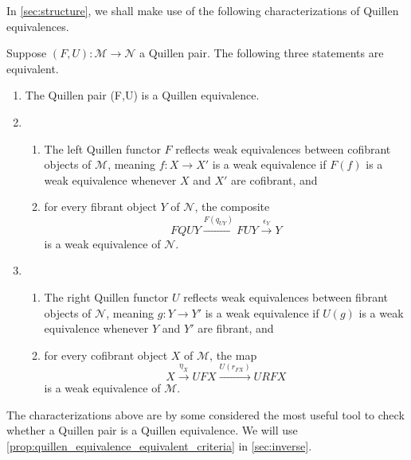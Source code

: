 In \cref{sec:structure}, we shall make use of the following characterizations \cite[Cor.~1.3.16, p.~21]{Ho99} of Quillen equivalences.
\begin{proposition}\label{prop:quillen_equivalence_equivalent_criteria}
Suppose $(F,U):\mathscr{M} \to \mathscr{N}$ a Quillen pair. The following three statements are equivalent.
\begin{enumerate}
\item{The Quillen pair (F,U) is a Quillen equivalence.}
\item{
	\begin{enumerate}
	\item{The left Quillen functor $F$ reflects weak equivalences between cofibrant objects of $\mathscr{M}$, meaning $f:X\to X'$ is a weak equivalence if $F(f)$ is a weak equivalence whenever $X$ and $X'$ are cofibrant, and}
	\item{for every fibrant object $Y$ of $\mathscr{N}$, the composite
	\[FQUY\xrightarrow{F(q_{UY})} FUY\xrightarrow{\epsilon _Y} Y\]
	is a weak equivalence of $\mathscr{N}$.}
	\end{enumerate}
}
\item{
	\begin{enumerate}
	\item{The right Quillen functor $U$ reflects weak equivalences between fibrant objects of $\mathscr{N}$, meaning $g:Y\to Y'$ is a weak equivalence if $U(g)$ is a weak equivalence whenever $Y$ and $Y'$ are fibrant, and}
	\item{for every cofibrant object $X$ of $\mathscr{M}$, the map
	\[X\xrightarrow{\eta _X} UFX\xrightarrow{U(r_{FX})} URFX\]
	is a weak equivalence of $\mathscr{M}$.}
	\end{enumerate}
}
\end{enumerate}
\end{proposition}
\noindent The characterizations above are by some considered the most useful tool to check whether a Quillen pair is a Quillen equivalence. We will use \cref{prop:quillen_equivalence_equivalent_criteria} in \cref{sec:inverse}.


